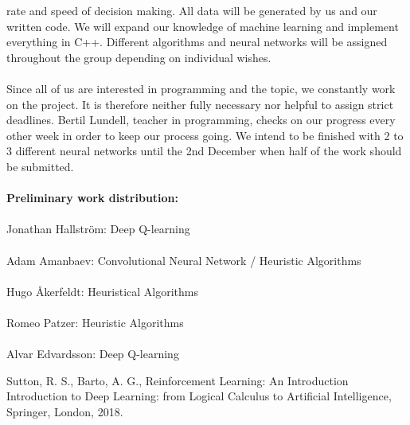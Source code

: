 \documentclass[titlepage]{article}
\begin{document}
rate and speed of decision making. All data will be generated by us and our written code. 
\newpage
\noindent
We will expand our knowledge of machine learning and implement everything in C++. Different algorithms and neural networks will be assigned throughout the group depending on individual wishes. \\\\Since all of us are interested in programming and the topic, we constantly work on the project. It is therefore neither fully necessary nor helpful to assign strict deadlines. Bertil Lundell, teacher in programming, checks on our progress every other week in order to keep our process going. We intend to be finished with 2 to 3 different neural networks until the 2nd December when half of the work should be submitted. \\\\\textbf{Preliminary work distribution:} \\\\Jonathan Hallström: Deep Q-learning \\\\Adam Amanbaev: Convolutional Neural Network / Heuristic Algorithms \\\\Hugo Åkerfeldt: Heuristical Algorithms \\\\Romeo Patzer: Heuristic Algorithms \\\\Alvar Edvardsson: Deep Q-learning 

\begin{thebibliography}{100}
Sutton, R. S., Barto, A. G., Reinforcement Learning: An Introduction
Introduction to Deep Learning: from Logical Calculus to Artificial Intelligence, Springer,
London, 2018.
\end{thebibliography}
\end{document}
